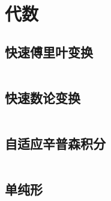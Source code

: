 \chapter{代数}
\section{快速傅里叶变换}
\inputminted{cpp}{\source/algebra/fast-fourier-transform.cpp}
\section{快速数论变换}
\inputminted{cpp}{\source/algebra/number-theory-transform.cpp}
\section{自适应辛普森积分}
\inputminted{cpp}{\source/algebra/adaptive-simpsons-method.cpp}
\section{单纯形}
\inputminted{cpp}{\source/algebra/simplex.cpp}
